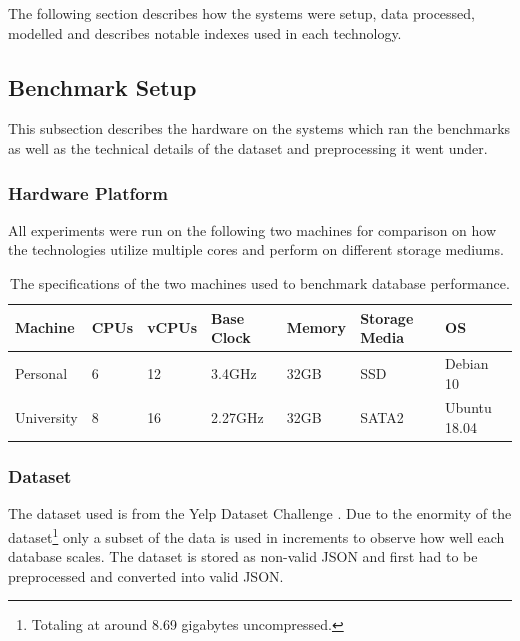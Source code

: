 The following section describes how the systems were setup, data processed, modelled and describes notable indexes used in each technology.

\subsection{Benchmark Setup}

This subsection describes the hardware on the systems which ran the benchmarks as well as the technical details of the dataset and preprocessing it went under.

\subsubsection{Hardware Platform}

All experiments were run on the following two machines for comparison on how the technologies utilize multiple cores and perform on different storage mediums.

\begin{table}[h]
    \centering
    \caption{The specifications of the two machines used to benchmark database performance.}
    \vspace*{5mm}
    \begin{tabular}{ |p{2cm}|p{1.5cm}|p{1.5cm}|p{1.6cm}|p{1.5cm}|p{2cm}|p{2cm}|}
        \hline
        \rowcolor{Gray}
        Machine    & CPUs & vCPUs & Base Clock & Memory & Storage Media & OS           \\
        \hline
        Personal   & 6    & 12    & 3.4GHz     & 32GB   & SSD           & Debian 10    \\
        University & 8    & 16    & 2.27GHz    & 32GB   & SATA2         & Ubuntu 18.04 \\
        \hline
    \end{tabular}
    \label{tab:hardware}
\end{table}

\subsubsection{Dataset}
The dataset used is from the Yelp Dataset Challenge \cite{yelpdataset}. Due to the enormity of the dataset\footnote{Totaling at around 8.69 gigabytes uncompressed.} only a subset of the data is used in increments to observe how well each database scales. The dataset is stored as non-valid JSON and first had to be preprocessed and converted into valid JSON.

